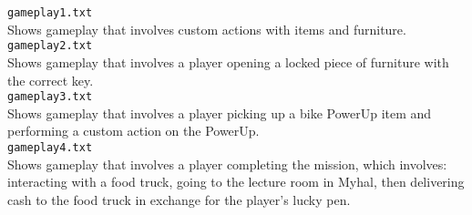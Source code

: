 \documentclass[11pt]{article}
\begin{document}
\texttt{gameplay1.txt} \\
Shows gameplay that involves custom actions with items and furniture. \\
\texttt{gameplay2.txt} \\
Shows gameplay that involves a player opening a locked piece of furniture with the correct key. \\
\texttt{gameplay3.txt} \\
Shows gameplay that involves a player picking up a bike PowerUp item and performing a custom action on the PowerUp. \\
\texttt{gameplay4.txt} \\
Shows gameplay that involves a player completing the mission, which involves: interacting with a food truck, going
    to the lecture room in Myhal, then delivering cash to the food truck in exchange for the player's lucky pen. \\
\end{document}
